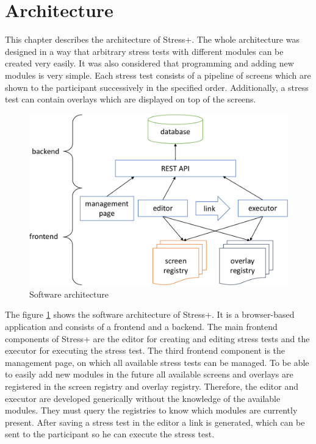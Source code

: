 \section{Architecture}
\label{sec:architecture}

This chapter describes the architecture of Stress+.
The whole architecture was designed in a way that arbitrary stress tests with different modules can be created very easily.
It was also considered that programming and adding new modules is very simple.
Each stress test consists of a pipeline of screens which are shown to the participant successively in the specified order.
Additionally, a stress test can contain overlays which are displayed on top of the screens.

\begin{figure}[htb]
  \centering
  \includegraphics[width=\textwidth]{figures/Architecture-crop}
  \caption{Software architecture}
  \label{fig:software-architecture}
\end{figure}

The figure \ref{fig:software-architecture} shows the software architecture of Stress+.
It is a browser-based application and consists of a frontend and a backend.
The main frontend components of Stress+ are the editor for creating and editing stress tests and the executor for executing the stress test.
The third frontend component is the management page, on which all available stress tests can be managed.
To be able to easily add new modules in the future all available screens and overlays are registered in the screen registry and overlay registry. 
Therefore, the editor and executor are developed generically without the knowledge of the available modules.
They must query the registries to know which modules are currently present.
After saving a stress test in the editor a link is generated, which can be sent to the participant so he can execute the stress test.

